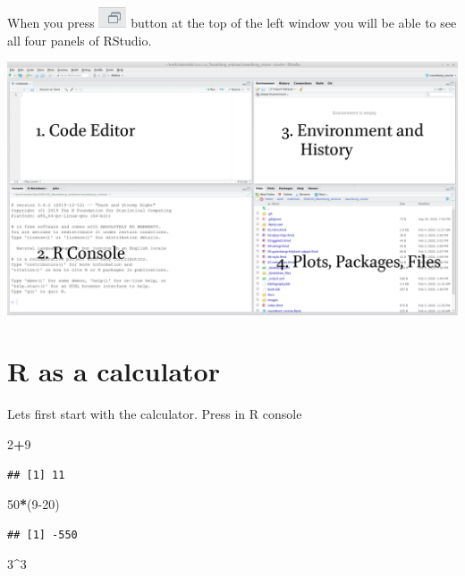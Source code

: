 \documentclass[
]{book}
\newenvironment{Shaded}{\begin{snugshade}}{\end{snugshade}}
\newcommand{\DecValTok}[1]{\textcolor[rgb]{0.00,0.00,0.81}{#1}}
\newcommand{\NormalTok}[1]{#1}
\newcommand{\OperatorTok}[1]{\textcolor[rgb]{0.81,0.36,0.00}{\textbf{#1}}}
\begin{document}
When you press \includegraphics{images/01.02.rstudio_button.png} button at the top of the left window you will be able to see all four panels of RStudio.

\includegraphics{images/01.03.rstudio.png}

\hypertarget{r-as-a-calculator}{%
\section{R as a calculator}\label{r-as-a-calculator}}

Lets first start with the calculator. Press in R console

\begin{Shaded}
\begin{Highlighting}[]
\DecValTok{2}\OperatorTok{+}\DecValTok{9}
\end{Highlighting}
\end{Shaded}

\begin{verbatim}
## [1] 11
\end{verbatim}

\begin{Shaded}
\begin{Highlighting}[]
\DecValTok{50}\OperatorTok{*}\NormalTok{(}\DecValTok{9-20}\NormalTok{)}
\end{Highlighting}
\end{Shaded}

\begin{verbatim}
## [1] -550
\end{verbatim}

\begin{Shaded}
\begin{Highlighting}[]
\DecValTok{3}\OperatorTok{^}\DecValTok{3}
\end{Highlighting}
\end{Shaded}
\end{document}
